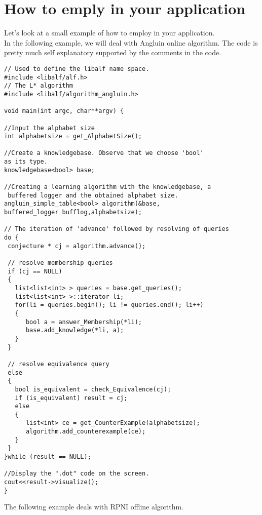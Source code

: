 \section{How to emply \libalf in your application}
Let's look at a small example of how to employ \libalf in your application. \\
In the following \cpp example, we will deal with Angluin online algorithm. The code is pretty much self explanatory supported by the comments in the code.
\lstset{language=c++, numbers=left, numberstyle=\tiny, stepnumber=1, numbersep=5pt}
\begin{lstlisting}[frame=single]
// Used to define the libalf name space.
#include <libalf/alf.h>
// The L* algorithm
#include <libalf/algorithm_angluin.h>

void main(int argc, char**argv) {

//Input the alphabet size
int alphabetsize = get_AlphabetSize();

//Create a knowledgebase. Observe that we choose 'bool' 
as its type.
knowledgebase<bool> base;

//Creating a learning algorithm with the knowledgebase, a
 buffered logger and the obtained alphabet size.
angluin_simple_table<bool> algorithm(&base,
buffered_logger bufflog,alphabetsize);

// The iteration of 'advance' followed by resolving of queries
do {
 conjecture * cj = algorithm.advance();

 // resolve membership queries
 if (cj == NULL) 
 {
   list<list<int> > queries = base.get_queries();
   list<list<int> >::iterator li;
   for(li = queries.begin(); li != queries.end(); li++) 
   {
      bool a = answer_Membership(*li);
      base.add_knowledge(*li, a);
   }
 }

 // resolve equivalence query
 else 
 {
   bool is_equivalent = check_Equivalence(cj);
   if (is_equivalent) result = cj; 
   else 
   {	
      list<int> ce = get_CounterExample(alphabetsize);
      algorithm.add_counterexample(ce);
   }
 }
}while (result == NULL);

//Display the ".dot" code on the screen.
cout<<result->visualize();
}
\end{lstlisting}

The following \java example deals with RPNI offline algorithm.


